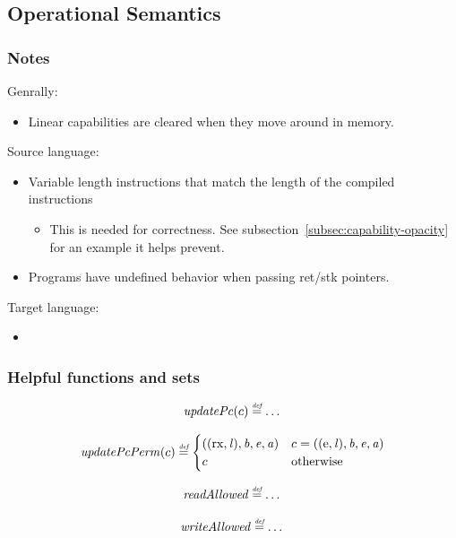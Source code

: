 \documentclass[a4paper]{article}
\newcommand{\defeq}{\stackrel{\textit{\tiny{def}}}{=}}
\newcommand{\totherwise}{\text{otherwise }}
\newcommand{\lin}{\var{l}}
\newcommand{\var}[1]{\mathit{#1}}
\newcommand{\baddr}{\var{b}}
\newcommand{\eaddr}{\var{e}}
\newcommand{\aaddr}{\var{a}}
\newcommand{\plainperm}[1]{\mathrm{#1}}
\newcommand{\rx}{\plainperm{rx}}
\newcommand{\enter}{\plainperm{e}}
\newcommand{\plainfun}[2]{
  \ifthenelse{\equal{#2}{}}
  {\mathit{#1}}
  {\mathit{#1}(#2)}
}
\newcommand{\updPcAddr}[1]{\plainfun{updatePc}{#1}}
\newcommand{\updPcPerm}[1]{\plainfun{updatePcPerm}{#1}}
\newcommand{\readAllowed}[1]{\plainfun{readAllowed}{#1}}
\newcommand{\writeAllowed}[1]{\plainfun{writeAllowed}{#1}}
\begin{document}
\subsection{Operational Semantics}
\subsubsection{Notes}
Genrally:
\begin{itemize}
\item Linear capabilities are cleared when they move around in memory.
\end{itemize}

Source language:
\begin{itemize}
\item Variable length instructions that match the length of the compiled instructions
  \begin{itemize}
  \item This is needed for correctness. See subsection~\ref{subsec:capability-opacity} for an example it helps prevent.
  \end{itemize}
\item Programs have undefined behavior when passing ret/stk pointers.
\end{itemize}

Target language:
\begin{itemize}
\item 
\end{itemize}

\subsubsection{Helpful functions and sets}


\[
  \updPcAddr{c} \defeq \dots
\]

\[
  \updPcPerm{c} \defeq
  \begin{cases}
    ((\rx,\lin),\baddr,\eaddr,\aaddr) & c = ((\enter,\lin),\baddr,\eaddr,\aaddr)\\
    c & \totherwise
  \end{cases}
\]

\[
  \readAllowed{} \defeq \dots
\]

\[
  \writeAllowed{} \defeq \dots
\]
\end{document}
